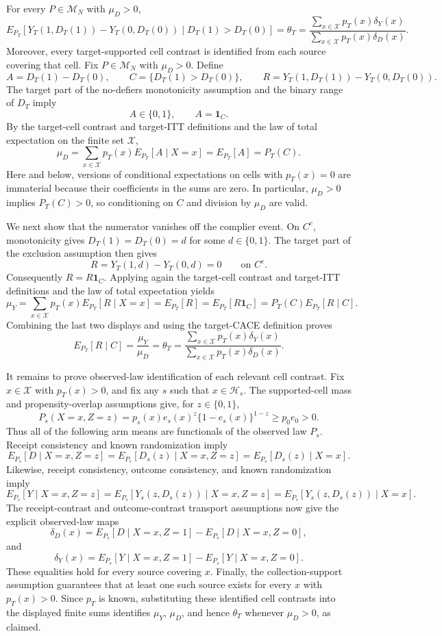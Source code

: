 For every \(P\in\mathcal M_N\) with \(\mu_D>0\),
\[
E_{P_T}\!\left[Y_T(1,D_T(1))-Y_T(0,D_T(0))\mid D_T(1)>D_T(0)\right]
=\theta_T
=\frac{\sum_{x\in\mathcal X}p_T(x)\delta_Y(x)}
{\sum_{x\in\mathcal X}p_T(x)\delta_D(x)}.
\]
Moreover, every target-supported cell contrast is identified from each source covering that cell.
Fix \(P\in\mathcal M_N\) with \(\mu_D>0\).  Define
\[
A=D_T(1)-D_T(0),\qquad
C=\{D_T(1)>D_T(0)\},
\qquad
R=Y_T(1,D_T(1))-Y_T(0,D_T(0)).
\]
The target part of the no-defiers monotonicity assumption and the binary range of \(D_T\) imply
\[
A\in\{0,1\},\qquad A=\mathbf 1_C.
\]
By the target-cell contrast and target-ITT definitions and the law of total expectation on the finite set \(\mathcal X\),
\[
\mu_D
=\sum_{x\in\mathcal X}p_T(x)E_{P_T}[A\mid X=x]
=E_{P_T}[A]
=P_T(C).
\]
Here and below, versions of conditional expectations on cells with \(p_T(x)=0\) are immaterial because their coefficients in the sums are zero.  In particular, \(\mu_D>0\) implies \(P_T(C)>0\), so conditioning on \(C\) and division by \(\mu_D\) are valid.

We next show that the numerator vanishes off the complier event.  On \(C^c\), monotonicity gives \(D_T(1)=D_T(0)=d\) for some \(d\in\{0,1\}\).  The target part of the exclusion assumption then gives
\[
R=Y_T(1,d)-Y_T(0,d)=0\qquad\text{on }C^c.
\]
Consequently \(R=R\mathbf 1_C\).  Applying again the target-cell contrast and target-ITT definitions and the law of total expectation yields
\[
\mu_Y
=\sum_{x\in\mathcal X}p_T(x)E_{P_T}[R\mid X=x]
=E_{P_T}[R]
=E_{P_T}[R\mathbf 1_C]
=P_T(C)E_{P_T}[R\mid C].
\]
Combining the last two displays and using the target-CACE definition proves
\[
E_{P_T}[R\mid C]
=\frac{\mu_Y}{\mu_D}
=\theta_T
=\frac{\sum_{x\in\mathcal X}p_T(x)\delta_Y(x)}
{\sum_{x\in\mathcal X}p_T(x)\delta_D(x)}.
\]

It remains to prove observed-law identification of each relevant cell contrast.  Fix \(x\in\mathcal X\) with \(p_T(x)>0\), and fix any \(s\) such that \(x\in\mathcal H_s\).  The supported-cell mass and propensity-overlap assumptions give, for \(z\in\{0,1\}\),
\[
P_s(X=x,Z=z)
=p_s(x)e_s(x)^z\{1-e_s(x)\}^{1-z}
\ge p_0e_0>0.
\]
Thus all of the following arm means are functionals of the observed law \(P_s\).  Receipt consistency and known randomization imply
\[
E_{P_s}[D\mid X=x,Z=z]
=E_{P_s}[D_s(z)\mid X=x,Z=z]
=E_{P_s}[D_s(z)\mid X=x].
\]
Likewise, receipt consistency, outcome consistency, and known randomization imply
\[
E_{P_s}[Y\mid X=x,Z=z]
=E_{P_s}[Y_s(z,D_s(z))\mid X=x,Z=z]
=E_{P_s}[Y_s(z,D_s(z))\mid X=x].
\]
The receipt-contrast and outcome-contrast transport assumptions now give the explicit observed-law maps
\[
\delta_D(x)
=E_{P_s}[D\mid X=x,Z=1]-E_{P_s}[D\mid X=x,Z=0],
\]
and
\[
\delta_Y(x)
=E_{P_s}[Y\mid X=x,Z=1]-E_{P_s}[Y\mid X=x,Z=0].
\]
These equalities hold for every source covering \(x\).  Finally, the collection-support assumption guarantees that at least one such source exists for every \(x\) with \(p_T(x)>0\).  Since \(p_T\) is known, substituting these identified cell contrasts into the displayed finite sums identifies \(\mu_Y\), \(\mu_D\), and hence \(\theta_T\) whenever \(\mu_D>0\), as claimed.

